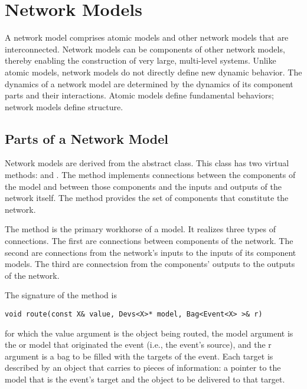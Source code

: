 \chapter{Network Models}
\label{chapter:network_models}
A network model comprises atomic models and other network models that are interconnected. Network models can be components of other network models, thereby enabling the construction of very large, multi-level systems. Unlike atomic models, network models do not directly define new dynamic behavior. The dynamics of a network model are determined by the dynamics of its component parts and their interactions. Atomic models define fundamental behaviors; network models define structure. 

\section{Parts of a Network Model}
\label{section:parts_of_a_network_model}
Network models are derived from the abstract  class. This class has two virtual methods:  and . The  method implements connections between the components of the  model and between those components and the inputs and outputs of the network itself. The  method provides the set of components that constitute the network.

The  method is the primary workhorse of a  model. It realizes three types of connections. The first are connections between components of the network. The second are connections from the network's inputs to the inputs of its component models. The third are connectsion from the components' outputs to the outputs of the network.

The signature of the  method is
\begin{verbatim}
void route(const X& value, Devs<X>* model, Bag<Event<X> >& r) 
\end{verbatim}
for which the value argument is the object being routed, the model argument is the  or  model that originated the event (i.e., the event's source), and the r argument is a bag to be filled with the targets of the event. Each target is described by an  object that carries to pieces of information: a pointer to the model that is the event's target and the object to be delivered to that target.

